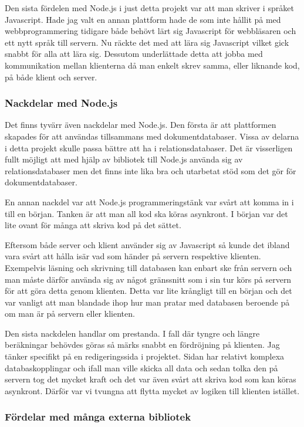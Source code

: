 Den sista fördelen med Node.js i just detta projekt var att man skriver i språket Javascript. Hade jag valt en annan plattform hade de som inte hållit på med webbprogrammering tidigare både behövt lärt sig Javascript för webbläsaren och ett nytt språk till servern. Nu räckte det med att lära sig Javascript vilket gick snabbt för alla att lära sig. Dessutom underlättade detta att jobba med kommunikation mellan klienterna då man enkelt skrev samma, eller liknande kod, på både klient och server.

\subsubsection{Nackdelar med Node.js}

Det finns tyvärr även nackdelar med Node.js. Den första är att plattformen skapades för att användas tillsammans med dokumentdatabaser. Vissa av delarna i detta projekt skulle passa bättre att ha i relationsdatabaser. Det är visserligen fullt möjligt att med hjälp av bibliotek till Node.js använda sig av relationsdatabaser men det finns inte lika bra och utarbetat stöd som det gör för dokumentdatabaser.

En annan nackdel var att Node.js programmeringstänk var svårt att komma in i till en början. Tanken är att man all kod ska köras asynkront. I början var det lite ovant för många att skriva kod på det sättet. 

Eftersom både server och klient använder sig av Javascript så kunde det ibland vara svårt att hålla isär vad som händer på servern respektive klienten. Exempelvis läsning och skrivning till databasen kan enbart ske från servern och man måste därför använda sig av något gränssnitt som i sin tur körs på servern för att göra detta genom klienten. Detta var lite krångligt till en början och det var vanligt att man blandade ihop hur man pratar med databasen beroende på om man är på servern eller klienten.

Den sista nackdelen handlar om prestanda. I fall där tyngre och längre beräkningar behövdes göras så märks snabbt en fördröjning på klienten. Jag tänker specifikt på en redigeringssida i projektet. Sidan har relativt komplexa databaskopplingar och ifall man ville skicka all data och sedan tolka den på servern tog det mycket kraft och det var även svårt att skriva kod som kan köras asynkront. Därför var vi tvungna att flytta mycket av logiken till klienten istället.

\subsubsection{Fördelar med många externa bibliotek} 

